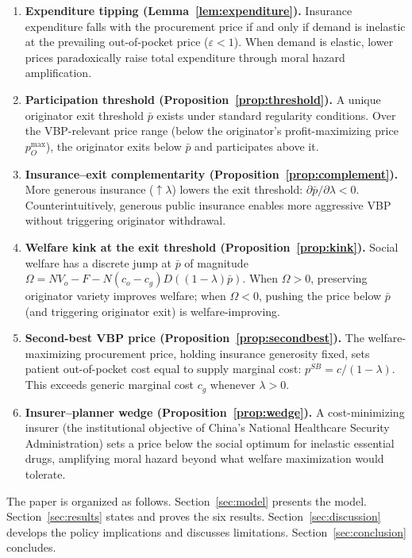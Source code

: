 \documentclass[12pt]{article}
\theoremstyle{plain}
\theoremstyle{definition}
\theoremstyle{remark}
\newcommand{\1}{\mathbf{1}}
\begin{document}
\begin{enumerate}
\item \textbf{Expenditure tipping (Lemma~\ref{lem:expenditure}).} Insurance expenditure falls with the procurement price if and only if demand is inelastic at the prevailing out-of-pocket price ($\varepsilon < 1$). When demand is elastic, lower prices paradoxically raise total expenditure through moral hazard amplification.

\item \textbf{Participation threshold (Proposition~\ref{prop:threshold}).} A unique originator exit threshold $\bar{p}$ exists under standard regularity conditions. Over the VBP-relevant price range (below the originator's profit-maximizing price $p_O^{\max}$), the originator exits below $\bar{p}$ and participates above it.

\item \textbf{Insurance--exit complementarity (Proposition~\ref{prop:complement}).} More generous insurance ($\uparrow \lambda$) lowers the exit threshold: $\partial\bar{p}/\partial\lambda < 0$. Counterintuitively, generous public insurance enables more aggressive VBP without triggering originator withdrawal.

\item \textbf{Welfare kink at the exit threshold (Proposition~\ref{prop:kink}).} Social welfare has a discrete jump at $\bar{p}$ of magnitude $\Omega = NV_o - F - N(c_o - c_g)D((1-\lambda)\bar{p})$. When $\Omega > 0$, preserving originator variety improves welfare; when $\Omega < 0$, pushing the price below $\bar{p}$ (and triggering originator exit) is welfare-improving.

\item \textbf{Second-best VBP price (Proposition~\ref{prop:secondbest}).} The welfare-maximizing procurement price, holding insurance generosity fixed, sets patient out-of-pocket cost equal to supply marginal cost: $p^{SB} = c/(1-\lambda)$. This exceeds generic marginal cost $c_g$ whenever $\lambda > 0$.

\item \textbf{Insurer--planner wedge (Proposition~\ref{prop:wedge}).} A cost-minimizing insurer (the institutional objective of China's National Healthcare Security Administration) sets a price below the social optimum for inelastic essential drugs, amplifying moral hazard beyond what welfare maximization would tolerate.
\end{enumerate}

The paper is organized as follows. Section~\ref{sec:model} presents the model. Section~\ref{sec:results} states and proves the six results. Section~\ref{sec:discussion} develops the policy implications and discusses limitations. Section~\ref{sec:conclusion} concludes.
\end{document}

